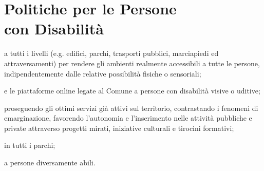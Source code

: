 \section[Politiche per le Persone con Disabilità]{Politiche per le Persone\\con Disabilità}
 a tutti i livelli (e.g. edifici, parchi, trasporti pubblici, marciapiedi ed attraversamenti) per rendere gli ambienti realmente accessibili a tutte le persone, indipendentemente dalle relative possibilità fisiche o sensoriali;

 e le piattaforme online legate al Comune a persone con disabilità visive o uditive;

 proseguendo gli ottimi servizi già attivi sul territorio, contrastando i fenomeni di emarginazione, favorendo l'autonomia e l'inserimento nelle attività pubbliche e private attraverso progetti mirati, iniziative culturali e tirocini formativi;

 in tutti i parchi;

 a persone diversamente abili.
